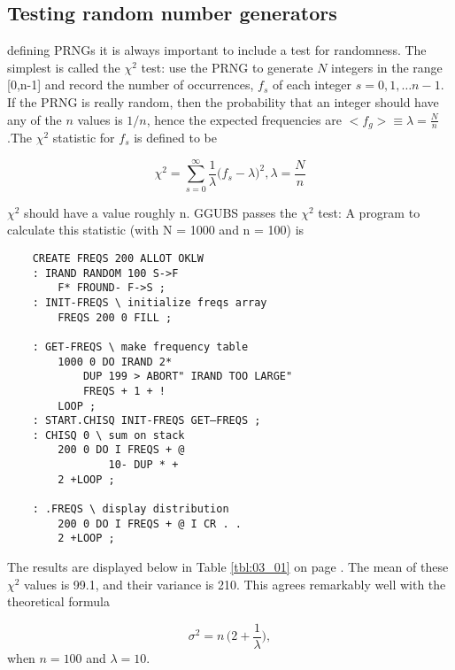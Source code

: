 
\subsection{Testing random number generators}
 defining PRNGs it is always important to include a test
for randomness. The simplest is called the $\chi^2$ test: use the
PRNG to generate $N$ integers in the range [0,n-1] and record
the number of occurrences, $f_s$ of each integer $s = 0, 1, \dots n-1$. If
the PRNG is really random, then the probability that an integer
should have any of the $n$ values is $1/n$, hence the expected 
frequencies are $<f_g> \equiv \lambda = \frac{N}{n}$ .The $\chi^2$ statistic for $f_s$ is defined to
be

\begin{equation}
\chi^2=\sum_{s=0}^{\infty}\frac{1}{\lambda}\Big(f_s-\lambda\Big)^2, \lambda=\frac{N}{n} %
\end{equation}


$\chi^2$ should have a value roughly n. GGUBS passes the $\chi^2$ test: A
program to calculate this statistic (with N = 1000 and n = 100) is

\begin{lstlisting}
    CREATE FREQS 200 ALLOT OKLW
    : IRAND RANDOM 100 S->F
        F* FROUND- F->S ;
    : INIT-FREQS \ initialize freqs array
        FREQS 200 0 FILL ;

    : GET-FREQS \ make frequency table
        1000 0 DO IRAND 2*
            DUP 199 > ABORT" IRAND TOO LARGE"
            FREQS + 1 + !
        LOOP ;
    : START.CHISQ INIT-FREQS GET—FREQS ;
    : CHISQ 0 \ sum on stack
        200 0 DO I FREQS + @
                10- DUP * +
        2 +LOOP ;

    : .FREQS \ display distribution
        200 0 DO I FREQS + @ I CR . . 
        2 +LOOP ;
\end{lstlisting}
 


The results are displayed below in Table \ref{tbl:03_01} on page \pageref{tbl:03_01}. The mean
of these $\chi^2$ values is 99.1, and their variance is 210. This agrees
remarkably well with the theoretical formula

\begin{equation*}
    \sigma^2=n \, \Big(2+\frac{1}{\lambda}\Big),
\end{equation*}
when $n = 100$ and $\lambda = 10$.

